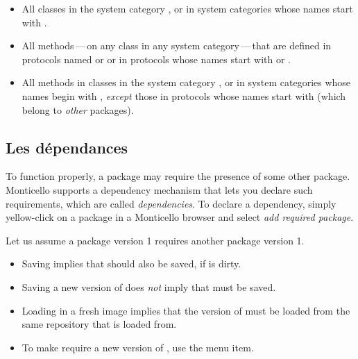 \documentclass[a4paper,10pt,twoside]{book}
\begin{document}
\begin{itemize}
\item All classes in the system category , or in system categories whose names start with .
\item All methods\,---\,on any class in any system category\,---\,that are defined in protocols named  or  or in protocols whose names start with  or .
\item All methods in classes in the system category , or in system categories whose names begin with , \emph{except} those in protocols whose names start with \prot{*} (\ie which belong to \emph{other} packages).
\end{itemize}

\subsection{Les d\'ependances} %

To function properly, a package may require the presence of some other package. 
Monticello supports a dependency mechanism that lets you declare such requirements, which are called \emph{dependencies}. To declare a dependency, simply yellow-click on a package in a Monticello browser and select \emph{add required package}.  

Let us assume a package  version 1 requires another package  version 1.

\begin{itemize}
\item Saving  implies that  should also be saved, if  is dirty.
\item Saving a new version of  does \emph{not} imply that  must be saved.
\item Loading  in a fresh image implies that the  version of  must be loaded from the same repository that  is loaded from.  
\item To make  require a new version of , use the  menu item. 
\end{itemize}
\end{document}
